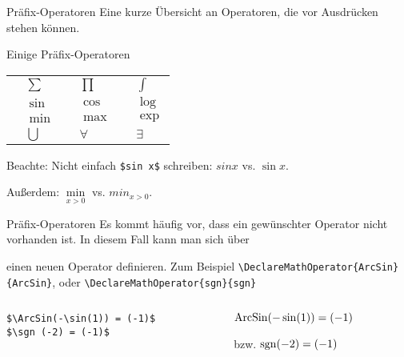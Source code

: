 \begin{frame}[fragile]{Präfix-Operatoren}
Eine kurze Übersicht an Operatoren, die vor Ausdrücken stehen können.
\begin{block}{Einige Präfix-Operatoren}
\center
\begin{tabular}{*{3}{|rl}|}\hline
{} & $\sum$ &  & $\prod$ &  & $\int$ \\
 & $\sin$ &  & $\cos$ &  & $\log$\\
 & $\min$ &  & $\max$ &  & $\exp$ \\
 & $\bigcup$ &  & $\forall$ &  & $\exists$ \\ \hline
\end{tabular}
\end{block}\pause
\alert{Beachte:} Nicht einfach \texttt{\$sin x\$} schreiben: $sin x$ vs. $\sin x$. 

\medskip\pause
Außerdem: $\min\limits_{x>0}$ vs. $min_{x>0}$. 
\end{frame}

\begin{frame}[fragile]{Präfix-Operatoren}
Es kommt häufig vor, dass ein gewünschter Operator nicht vorhanden ist. In diesem Fall kann man sich über 
\begin{center}
\end{center}
einen neuen Operator definieren. Zum Beispiel \verb+\DeclareMathOperator{ArcSin}{ArcSin}+, oder \verb+\DeclareMathOperator{sgn}{sgn}+\pause
\begin{columns}
\begin{column}{0.55\textwidth}
\begin{codeblock}
\begin{verbatim}
$\ArcSin(-\sin(1)) = (-1)$ 
$\sgn (-2) = (-1)$
\end{verbatim}
\end{codeblock}
\end{column}
\begin{column}{0.4\textwidth}
${\operatorname{ArcSin}(-\sin(1)) = (-1)}$ 

bzw. $\operatorname{sgn} (-2) = (-1)$
\end{column}
\end{columns}
\end{frame}

